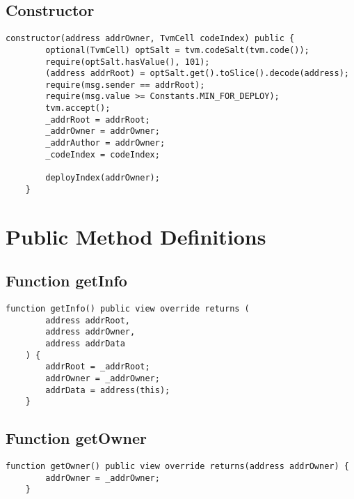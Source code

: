 \subsection{Constructor}



\begin{lstlisting}[firstnumber=20]
    constructor(address addrOwner, TvmCell codeIndex) public {
        optional(TvmCell) optSalt = tvm.codeSalt(tvm.code());
        require(optSalt.hasValue(), 101);
        (address addrRoot) = optSalt.get().toSlice().decode(address);
        require(msg.sender == addrRoot);
        require(msg.value >= Constants.MIN_FOR_DEPLOY);
        tvm.accept();
        _addrRoot = addrRoot;
        _addrOwner = addrOwner;
        _addrAuthor = addrOwner;
        _codeIndex = codeIndex;

        deployIndex(addrOwner);
    }
\end{lstlisting}

\section{Public Method Definitions}


\subsection{Function getInfo}

\begin{lstlisting}[firstnumber=59]
    function getInfo() public view override returns (
        address addrRoot,
        address addrOwner,
        address addrData
    ) {
        addrRoot = _addrRoot;
        addrOwner = _addrOwner;
        addrData = address(this);
    }
\end{lstlisting}

\subsection{Function getOwner}

\begin{lstlisting}[firstnumber=69]
    function getOwner() public view override returns(address addrOwner) {
        addrOwner = _addrOwner;
    }
\end{lstlisting}


